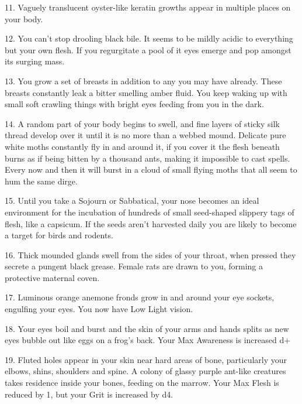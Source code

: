 11. Vaguely translucent oyster-like keratin growths appear in multiple places on your body.




12. You can't stop drooling black bile. It seems to be mildly acidic to everything but your own flesh. If you regurgitate a pool of it eyes emerge and pop amongst its surging mass.



13. You grow a set of breasts in addition to any you may have already. These breasts constantly leak a bitter smelling amber fluid. You keep waking up with small soft crawling things with bright eyes feeding from you in the dark.



14. A random part of your body begins to swell, and fine layers of sticky silk thread develop over it until it is no more than a webbed mound. Delicate pure white moths constantly fly in and around it, if you cover it the flesh beneath burns as if being bitten by a thousand ants, making it impossible to cast spells. Every now and then it will burst in a cloud of small flying moths that all seem to hum the same dirge.



15. Until you take a Sojourn or Sabbatical, your nose becomes an ideal environment for the incubation of hundreds of small seed-shaped slippery tags of flesh, like a capsicum. If the seeds aren't harvested daily you are likely to become a target for birds and rodents.



16. Thick mounded glands swell from the sides of your throat, when pressed they secrete a pungent black grease. Female rats are drawn to you, forming a protective maternal coven.








17. Luminous orange anemone fronds grow in and around your eye sockets, engulfing your eyes. You now have Low Light vision.



18. Your eyes boil and burst and the skin of your arms and hands splits as new eyes bubble out like eggs on a frog's back.  Your Max Awareness is increased {d+}





19. Fluted holes appear in your skin near hard areas of bone, particularly your elbows, shins, shoulders and spine. A colony of glassy purple ant-like creatures takes residence inside your bones, feeding on the marrow. Your Max Flesh is reduced by 1, but your Grit is increased by d4.



